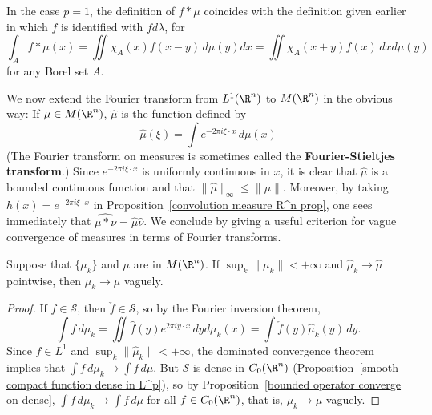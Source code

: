 In the case $p=1$, the definition of $f\ast\mu$ coincides with the definition given earlier in which $f$ is identified with $fd\lambda$, for
\[\int_Af\ast\mu(x)=\iint\chi_A(x)f(x-y)\,d\mu(y)dx=\iint\chi_A(x+y)f(x)\,dxd\mu(y)\]
for any Borel set $A$.\par
We now extend the Fourier transform from $L^1(\R^n)$ to $M(\R^n)$ in the obvious way: If $\mu\in M(\R^n)$, $\widehat{\mu}$ is the function defined by
\[\hat{\mu}(\xi)=\int e^{-2\pi i\xi\cdot x}\,d\mu(x)\]
(The Fourier transform on measures is sometimes called the \textbf{Fourier-Stieltjes transform}.) Since $e^{-2\pi i\xi\cdot x}$ is uniformly continuous in $x$, it is clear that $\hat{\mu}$ is a bounded continuous function and that $\|\hat{\mu}\|_\infty\leq\|\mu\|$. Moreover, by taking $h(x)=e^{-2\pi i\xi\cdot x}$ in Proposition~\ref{convolution measure R^n prop}, one sees immediately that $\widehat{\mu\ast\nu}=\hat{\mu}\hat{\nu}$. We conclude by giving a useful criterion for vague convergence of measures in terms of Fourier transforms.
\begin{proposition}\label{Fourier transform measure converge}
Suppose that $\{\mu_k\}$ and $\mu$ are in $M(\R^n)$. If $\sup_{k}\|\mu_k\|<+\infty$ and $\hat{\mu}_k\to\hat{\mu}$ pointwise, then $\mu_k\to\mu$ vaguely.
\end{proposition}
\begin{proof}
If $f\in\mathscr{S}$, then $\check{f}\in\mathscr{S}$, so by the Fourier inversion theorem,
\[\int f\,d\mu_k=\iint\hat{f}(y)e^{2\pi iy\cdot x}\,dyd\mu_k(x)=\int\check{f}(y)\hat{\mu}_k(y)\,dy.\]
Since $\hat{f}\in L^1$ and $\sup_k\|\hat{\mu}_k\|<+\infty$, the dominated convergence theorem implies that $\int f\,d\mu_k\to\int f\,d\mu$. But $\mathscr{S}$ is dense in $C_0(\R^n)$ (Proposition~\ref{smooth compact function dense in L^p}), so by Proposition~\ref{bounded operator converge on dense}, $\int f\,d\mu_k\to\int f\,d\mu$ for all $f\in C_0(\R^n)$, that is, $\mu_k\to\mu$ vaguely.
\end{proof}
